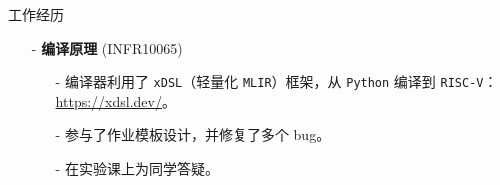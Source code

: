 \documentclass{resume} %
\newcommand{\itemsepval}{-6pt}
\newcommand{\code}{\texttt}
\begin{document}
\begin{rSection}{工作经历}
\begin{itemize}
\begin{itemize}
        \end{itemize}
    
        \item[-] \textbf{编译原理} (INFR10065)
        \begin{itemize}
            \itemsep \itemsepval {} 
            \item[-] 编译器利用了 \code{xDSL}（轻量化 \code{MLIR}）框架，从 \code{Python} 编译到 \code{RISC-V}：\url{https://xdsl.dev/}。
            \item[-] 参与了作业模板设计，并修复了多个 bug。
            \item[-] 在实验课上为同学答疑。
        \end{itemize}
    \end{itemize}





\end{rSection} 
\end{document}
